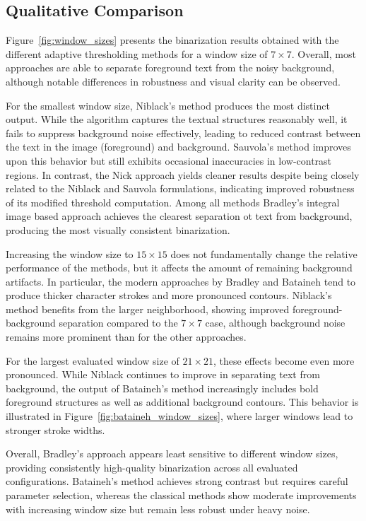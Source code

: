 \subsection{Qualitative Comparison}\label{subsec:qualitative_compare}

Figure~\ref{fig:window_sizes} presents the binarization results obtained with the different adaptive thresholding methods for a window size of $7\times 7$.
Overall, most approaches are able to separate foreground text from the noisy background, although notable differences in robustness and visual clarity can be observed.

For the smallest window size, Niblack's method produces the most distinct output. 
While the algorithm captures the textual structures reasonably well, it fails to suppress background noise effectively, leading to reduced contrast between the text in the image (foreground) and background.
Sauvola's method improves upon this behavior but still exhibits occasional inaccuracies in low-contrast regions.
In contrast, the Nick approach yields cleaner results despite being closely related to the Niblack and Sauvola formulations, indicating improved robustness of its modified threshold computation.
Among all methods Bradley's integral image based approach achieves the clearest separation ot text from background, producing the most visually consistent binarization. 

Increasing the window size to $15\times 15$ does not fundamentally change the relative performance of the methods, but it affects the amount of remaining background artifacts.
In particular, the modern approaches by Bradley and Bataineh tend to produce thicker character strokes and more pronounced contours.
Niblack's method benefits from the larger neighborhood, showing improved foreground-background separation compared to the $7\times 7$ case, although background noise remains more prominent than for the other approaches.

For the largest evaluated window size of $21\times 21$, these effects become even more pronounced. 
While Niblack continues to improve in separating text from background, the output of Bataineh's method increasingly includes bold foreground structures as well as additional background contours.
This behavior is illustrated in Figure~\ref{fig:bataineh_window_sizes}, where larger windows lead to stronger stroke widths. 

Overall, Bradley's approach appears least sensitive to different window sizes, providing consistently high-quality binarization across all evaluated configurations.
Bataineh's method achieves strong contrast but requires careful parameter selection, whereas the classical methods show moderate improvements with increasing window size but remain less robust under heavy noise.
